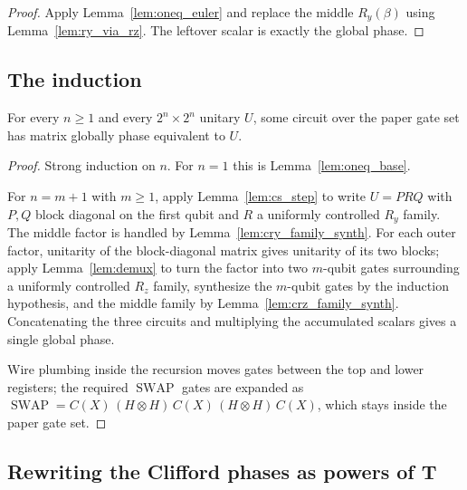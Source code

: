 \begin{proof}
  \leanok
  Apply Lemma~\ref{lem:oneq_euler} and replace the middle $R_y(\beta)$ using
  Lemma~\ref{lem:ry_via_rz}.  The leftover scalar is exactly the global phase.
\end{proof}

\subsection{The induction}

\begin{theorem}
  \label{thm:clifford_rz_universal}
  \leanok
  For every $n \ge 1$ and every $2^n \times 2^n$ unitary $U$, some circuit over
  the paper gate set has matrix globally phase equivalent to $U$.
\end{theorem}

\begin{proof}
  \leanok
  Strong induction on $n$.  For $n = 1$ this is Lemma~\ref{lem:oneq_base}.

  For $n = m+1$ with $m \ge 1$, apply Lemma~\ref{lem:cs_step} to write
  $U = PRQ$ with $P, Q$ block diagonal on the first qubit and $R$ a uniformly
  controlled $R_y$ family.  The middle factor is handled by
  Lemma~\ref{lem:cry_family_synth}.  For each outer factor, unitarity of the
  block-diagonal matrix gives unitarity of its two blocks; apply
  Lemma~\ref{lem:demux} to turn the factor into two $m$-qubit gates
  surrounding a uniformly controlled $R_z$ family, synthesize the $m$-qubit
  gates by the induction hypothesis, and the middle family by
  Lemma~\ref{lem:crz_family_synth}.  Concatenating the three circuits and
  multiplying the accumulated scalars gives a single global phase.

  Wire plumbing inside the recursion moves gates between the top and lower
  registers; the required $\operatorname{SWAP}$ gates are expanded as
  $\operatorname{SWAP} = C(X)\,(H\otimes H)\,C(X)\,(H\otimes H)\,C(X)$, which
  stays inside the paper gate set.
\end{proof}

\subsection{Rewriting the Clifford phases as powers of T}

